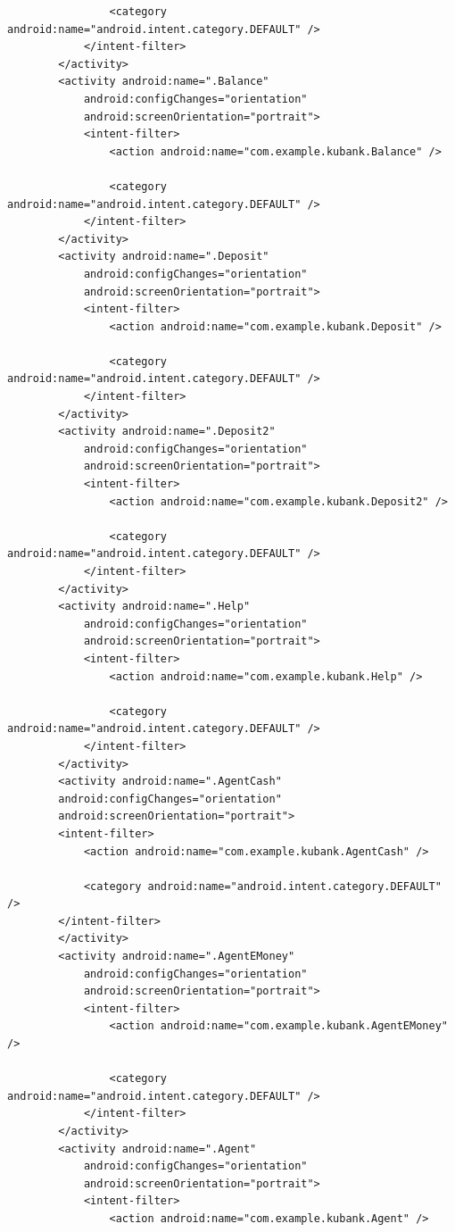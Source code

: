 \documentclass[11pt, a4paper]{article}
\begin{document}
\begin{appendices}
\begin{lstlisting}
                <category android:name="android.intent.category.DEFAULT" />
            </intent-filter>
        </activity>
        <activity android:name=".Balance"
            android:configChanges="orientation"
            android:screenOrientation="portrait">
            <intent-filter>
                <action android:name="com.example.kubank.Balance" />

                <category android:name="android.intent.category.DEFAULT" />
            </intent-filter>
        </activity>
        <activity android:name=".Deposit"
            android:configChanges="orientation"
            android:screenOrientation="portrait">
            <intent-filter>
                <action android:name="com.example.kubank.Deposit" />

                <category android:name="android.intent.category.DEFAULT" />
            </intent-filter>
        </activity>
        <activity android:name=".Deposit2"
            android:configChanges="orientation"
            android:screenOrientation="portrait">
            <intent-filter>
                <action android:name="com.example.kubank.Deposit2" />

                <category android:name="android.intent.category.DEFAULT" />
            </intent-filter>
        </activity>
        <activity android:name=".Help"
            android:configChanges="orientation"
            android:screenOrientation="portrait">
            <intent-filter>
                <action android:name="com.example.kubank.Help" />

                <category android:name="android.intent.category.DEFAULT" />
            </intent-filter>
        </activity>
        <activity android:name=".AgentCash"
        android:configChanges="orientation"
        android:screenOrientation="portrait">
        <intent-filter>
            <action android:name="com.example.kubank.AgentCash" />

            <category android:name="android.intent.category.DEFAULT" />
        </intent-filter>
        </activity>
        <activity android:name=".AgentEMoney"
            android:configChanges="orientation"
            android:screenOrientation="portrait">
            <intent-filter>
                <action android:name="com.example.kubank.AgentEMoney" />

                <category android:name="android.intent.category.DEFAULT" />
            </intent-filter>
        </activity>
        <activity android:name=".Agent"
            android:configChanges="orientation"
            android:screenOrientation="portrait">
            <intent-filter>
                <action android:name="com.example.kubank.Agent" />


\end{lstlisting}
\end{appendices}
\end{document}
